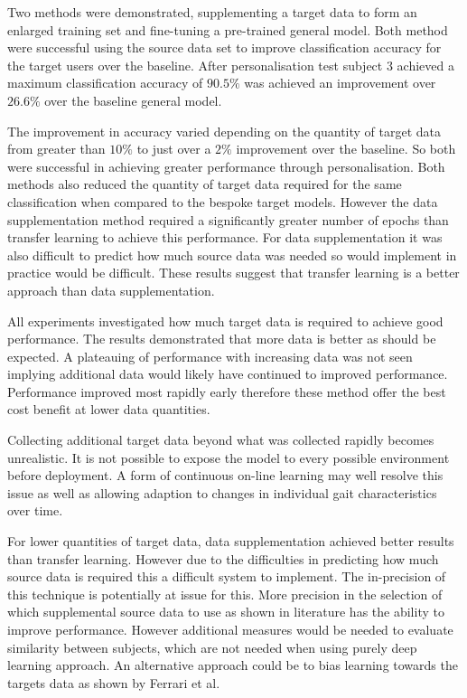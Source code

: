 Two methods were demonstrated, supplementing a target data to form an enlarged training set and fine-tuning a pre-trained general model. Both method were successful using the source data set to improve classification accuracy for the target users over the baseline. After personalisation test subject 3 achieved a maximum classification accuracy of $90.5\%$ was achieved an improvement over $26.6\%$ over the baseline general model.

The improvement in accuracy varied depending on the quantity of target data from greater than $10\%$ to just over a $2\%$ improvement over the baseline. So both were successful in achieving greater performance through personalisation. Both methods also reduced the quantity of target data required for the same classification when compared to the bespoke target models. However the data supplementation method required a significantly greater number of epochs than transfer learning to achieve this performance. For data supplementation it was also difficult to predict how much source data was needed so would implement in practice would be difficult. These results suggest that transfer learning is a better approach than data supplementation.

All experiments investigated how much target data is required to achieve good performance. The results demonstrated that more data is better as should be expected. A plateauing of performance with increasing data was not seen implying additional data would likely have continued to improved performance. Performance improved most rapidly early therefore these method offer the best cost benefit at lower data quantities.

Collecting additional target data beyond what was collected rapidly becomes unrealistic. It is not possible to expose the model to every possible environment before deployment. A form of continuous on-line learning may well resolve this issue as well as allowing adaption to changes in individual gait characteristics over time.

For lower quantities of target data, data supplementation achieved better results than transfer learning. However due to the difficulties in predicting how much source data is required this a difficult system to implement. The in-precision of this technique is potentially at issue for this. More precision in the selection of which supplemental source data to use as shown in literature has the ability to improve performance. However additional measures would be needed to evaluate similarity between subjects, which are not needed when using purely deep learning approach. An alternative approach could be to bias learning towards the targets data as shown by Ferrari et al\cite{Ferrari2020}.

